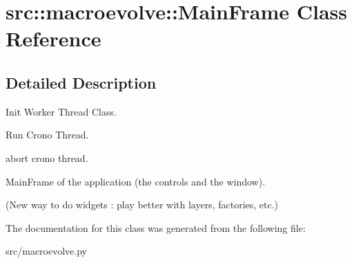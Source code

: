 \hypertarget{classsrc_1_1macroevolve_1_1MainFrame}{
\section{src::macroevolve::MainFrame Class Reference}
\label{classsrc_1_1macroevolve_1_1MainFrame}
}


\subsection{Detailed Description}
\begin{DoxyVerb}Init Worker Thread Class.\end{DoxyVerb}
 \begin{DoxyVerb}Run Crono Thread.\end{DoxyVerb}
 \begin{DoxyVerb}abort crono thread.\end{DoxyVerb}
 \begin{DoxyVerb}
MainFrame of the application (the controls and the window).

(New way to do widgets : play better with layers, factories, etc.)
\end{DoxyVerb}
 

The documentation for this class was generated from the following file:\begin{DoxyCompactItemize}
\item 
src/macroevolve.py\end{DoxyCompactItemize}
